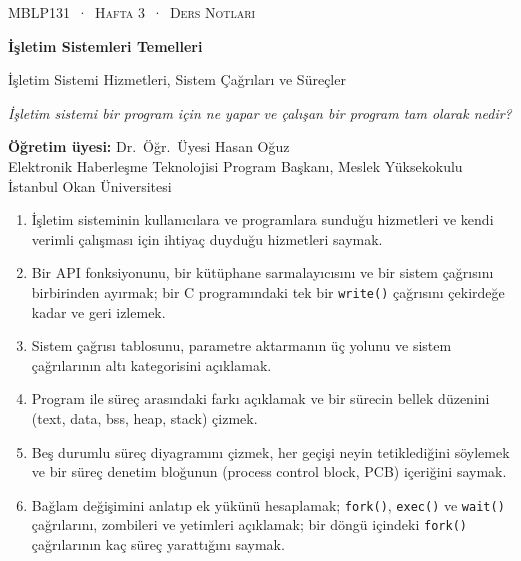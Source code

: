 \documentclass[11pt,a4paper]{article}
\newcommand{\cmd}[1]{\texttt{#1}}
\begin{document}
\setlength{\emergencystretch}{3em}
\thispagestyle{empty}
\begin{tcolorbox}[enhanced,colback=dark,colframe=dark,arc=0pt,boxrule=0pt,
  left=18pt,right=18pt,top=20pt,bottom=20pt,coltext=white]
{\small\color{mint}\textsc{MBLP131 \,·\, Hafta 3 \,·\, Ders Notları}}\par\medskip
{\headfont\fontsize{26}{30}\selectfont\bfseries İşletim Sistemleri Temelleri}\par\medskip
{\large İşletim Sistemi Hizmetleri, Sistem Çağrıları ve Süreçler}\par\smallskip
{\small\itshape\color{white!70} İşletim sistemi bir program için ne yapar ve çalışan bir program tam olarak nedir?}
\end{tcolorbox}

\vspace{0.4em}
\begin{minipage}[t]{0.70\linewidth}
\small
\textbf{Öğretim üyesi:} Dr.\ Öğr.\ Üyesi Hasan Oğuz\\
Elektronik Haberleşme Teknolojisi Program Başkanı, Meslek Yüksekokulu\\
İstanbul Okan Üniversitesi
\end{minipage}

\vspace{0.8em}
\begin{keyidea}
\begin{enumerate}[leftmargin=1.4em]
  \item İşletim sisteminin kullanıcılara ve programlara sunduğu hizmetleri ve kendi verimli çalışması için ihtiyaç duyduğu hizmetleri saymak.
  \item Bir API fonksiyonunu, bir kütüphane sarmalayıcısını ve bir sistem çağrısını birbirinden ayırmak; bir C programındaki tek bir \cmd{write()} çağrısını çekirdeğe kadar ve geri izlemek.
  \item Sistem çağrısı tablosunu, parametre aktarmanın üç yolunu ve sistem çağrılarının altı kategorisini açıklamak.
  \item Program ile süreç arasındaki farkı açıklamak ve bir sürecin bellek düzenini (text, data, bss, heap, stack) çizmek.
  \item Beş durumlu süreç diyagramını çizmek, her geçişi neyin tetiklediğini söylemek ve bir süreç denetim bloğunun (process control block, PCB) içeriğini saymak.
  \item Bağlam değişimini anlatıp ek yükünü hesaplamak; \cmd{fork()}, \cmd{exec()} ve \cmd{wait()} çağrılarını, zombileri ve yetimleri açıklamak; bir döngü içindeki \cmd{fork()} çağrılarının kaç süreç yarattığını saymak.
\end{enumerate}
\end{keyidea}
\end{document}
